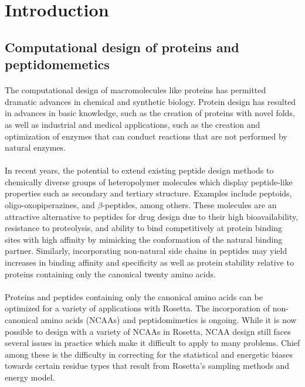 \section{Introduction}
\subsection{Computational design of proteins and peptidomemetics}
\paragraph{}
The computational design of macromolecules like proteins has permitted dramatic advances in chemical and synthetic biology.
Protein design has resulted in advances in basic knowledge, such as the creation of proteins with novel folds\cite{kuhlman_design_2003}, as well as industrial and medical applications, such as the creation and optimization of enzymes that can conduct reactions that are not performed by natural enzymes\cite{jiang_denovo_2008,rothlisberger_kemp_2008}.

\paragraph{}
In recent years, the potential to extend existing peptide design methods to chemically diverse groups of heteropolymer molecules which display peptide-like properties such as secondary and tertiary structure.
Examples include peptoids\cite{renfrew_incorporation_2012}, oligo-oxopiperazines\cite{lao_rational_2014}, and $\beta$-peptides\cite{molski_remodeling_2012}, among others.
These molecules are an attractive alternative to peptides for drug design due to their high bioavailability, resistance to proteolysis, and ability to bind competitively at protein binding sites with high affinity by mimicking the conformation of the natural binding partner\cite{lao_rational_2014}.
Similarly, incorporating non-natural side chains in peptides may yield increases in binding affinity and specificity as well as protein stability relative to proteins containing only the canonical twenty amino acids\cite{horng_values_2003}.

\paragraph{}
Proteins and peptides containing only the canonical amino acids can be optimized for a variety of applications with Rosetta\cite{leaver-fay_chapter_2011,jiang_denovo_2008,rothlisberger_kemp_2008,raveh_scheuler_furman_2011}.
The incorporation of non-canonical amino acids (NCAAs) and peptidomimetics is ongoing.
While it is now possible to design with a variety of NCAAs in Rosetta\cite{renfrew_incorporation_2012,drew_adding_2013}, NCAA design still faces several issues in practice which make it difficult to apply to many problems.
Chief among these is the difficulty in correcting for the statistical and energetic biases towards certain residue types that result from Rosetta's sampling methods and energy model.

